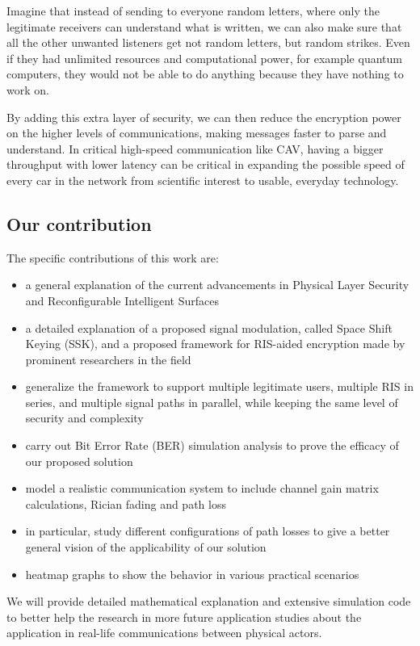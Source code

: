 Imagine that instead of sending to everyone random letters, where only the legitimate receivers can understand what is written, we can also make sure that all the other unwanted listeners get not random letters, but random strikes. Even if they had unlimited resources and computational power, for example quantum computers, they would not be able to do anything because they have nothing to work on.

By adding this extra layer of security, we can then reduce the encryption power on the higher levels of communications, making messages faster to parse and understand. In critical high-speed communication like CAV, having a bigger throughput with lower latency can be critical in expanding the possible speed of every car in the network from scientific interest to usable, everyday technology.

\subsection{Our contribution}

The specific contributions of this work are:
\begin{itemize}
  \item a general explanation of the current advancements in Physical Layer Security and Reconfigurable Intelligent Surfaces
  \item a detailed explanation of a proposed signal modulation, called Space Shift Keying (SSK), and a proposed framework for RIS-aided encryption made by prominent researchers in the field
  \item generalize the framework to support multiple legitimate users, multiple RIS in series, and multiple signal paths in parallel, while keeping the same level of security and complexity
  \item carry out Bit Error Rate (BER) simulation analysis to prove the efficacy of our proposed solution
  \item model a realistic communication system to include channel gain matrix calculations, Rician fading and path loss
  \item in particular, study different configurations of path losses to give a better general vision of the applicability of our solution
  \item heatmap graphs to show the behavior in various practical scenarios
\end{itemize}

We will provide detailed mathematical explanation and extensive simulation code to better help the research in more future application studies about the application in real-life communications between physical actors.


